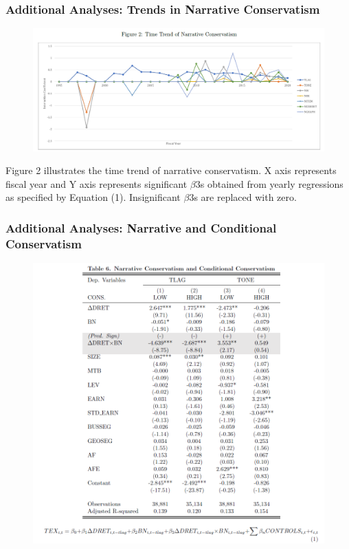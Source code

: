 \documentclass{beamer}
\begin{document}
\begin{frame}
	\frametitle{Additional Analyses: Trends in Narrative Conservatism}
	\begin{figure}[h]
		\centering
		\includegraphics[width=0.9\linewidth]{fig2}
		\label{fig2}
	\end{figure}
	\begin{footnotesize}
		Figure 2 illustrates the time trend of narrative conservatism. X axis represents fiscal year and Y axis represents significant $\beta3$s obtained from yearly
		regressions as specified by Equation (1). Insignificant $\beta3$s are replaced with zero.
	\end{footnotesize}
\end{frame}
\begin{frame}
	\frametitle{Additional Analyses: Narrative and Conditional Conservatism}
	\begin{figure}[h]
	\centering
	\includegraphics[width=0.6\linewidth]{tab6}
	\label{tab6}
	\end{figure}
	
\end{frame}
\end{document}
